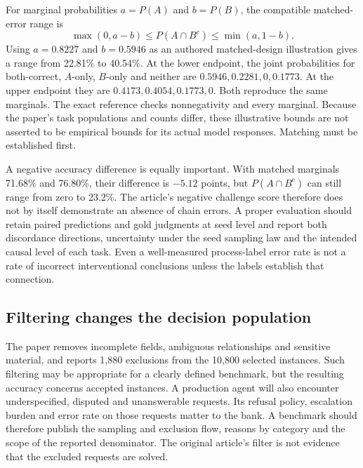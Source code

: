 For marginal probabilities $a=P(A)$ and $b=P(B)$, the compatible matched-error range is
\begin{equation}
 \max(0,a-b)\leq P(A\cap B^c)\leq\min(a,1-b).
 \label{exec21:check-bounds}
\end{equation}
Using $a=0.8227$ and $b=0.5946$ as an authored matched-design illustration gives a range from 22.81\% to 40.54\%. At the lower endpoint, the joint probabilities for both-correct, $A$-only, $B$-only and neither are $0.5946,0.2281,0,0.1773$. At the upper endpoint they are $0.4173,0.4054,0.1773,0$. Both reproduce the same marginals. The exact reference checks nonnegativity and every marginal. Because the paper's task populations and counts differ, these illustrative bounds are not asserted to be empirical bounds for its actual model responses. Matching must be established first.\citep{exec21_causalitycheck_reference}

A negative accuracy difference is equally important. With matched marginals 71.68\% and 76.80\%, their difference is $-5.12$ points, but $P(A\cap B^c)$ can still range from zero to 23.2\%. The article's negative challenge score therefore does not by itself demonstrate an absence of chain errors. A proper evaluation should retain paired predictions and gold judgments at seed level and report both discordance directions, uncertainty under the seed sampling law and the intended causal level of each task. Even a well-measured process-label error rate is not a rate of incorrect interventional conclusions unless the labels establish that connection.\citep{exec21_causalitycheck,exec21_causalitycheck_reference}

\subsection{Filtering changes the decision population}
\label{exec21:check-selection}
The paper removes incomplete fields, ambiguous relationships and sensitive material, and reports 1,880 exclusions from the 10,800 selected instances. Such filtering may be appropriate for a clearly defined benchmark, but the resulting accuracy concerns accepted instances. A production agent will also encounter underspecified, disputed and unanswerable requests. Its refusal policy, escalation burden and error rate on those requests matter to the bank. A benchmark should therefore publish the sampling and exclusion flow, reasons by category and the scope of the reported denominator. The original article's filter is not evidence that the excluded requests are solved.\citep{exec21_causalitycheck,exec21_causalitycheck_reference}

